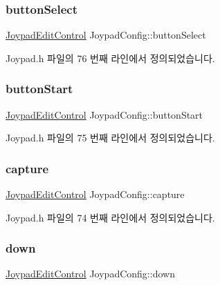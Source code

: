 \subsubsection{\texorpdfstring{button\+Select}{buttonSelect}}
{\footnotesize\ttfamily \mbox{\hyperlink{class_joypad_edit_control}{Joypad\+Edit\+Control}} Joypad\+Config\+::button\+Select}



Joypad.\+h 파일의 76 번째 라인에서 정의되었습니다.

\mbox{\label{class_joypad_config_a9083bf057d36c0fd78fe1976bee9fb74}} 
\subsubsection{\texorpdfstring{button\+Start}{buttonStart}}
{\footnotesize\ttfamily \mbox{\hyperlink{class_joypad_edit_control}{Joypad\+Edit\+Control}} Joypad\+Config\+::button\+Start}



Joypad.\+h 파일의 75 번째 라인에서 정의되었습니다.

\mbox{\label{class_joypad_config_a82881a0174178e60d0a60a2b574fd385}} 
\subsubsection{\texorpdfstring{capture}{capture}}
{\footnotesize\ttfamily \mbox{\hyperlink{class_joypad_edit_control}{Joypad\+Edit\+Control}} Joypad\+Config\+::capture}



Joypad.\+h 파일의 74 번째 라인에서 정의되었습니다.

\mbox{\label{class_joypad_config_ad42ffdfc61bb990382b0a35d15909644}} 
\subsubsection{\texorpdfstring{down}{down}}
{\footnotesize\ttfamily \mbox{\hyperlink{class_joypad_edit_control}{Joypad\+Edit\+Control}} Joypad\+Config\+::down}



